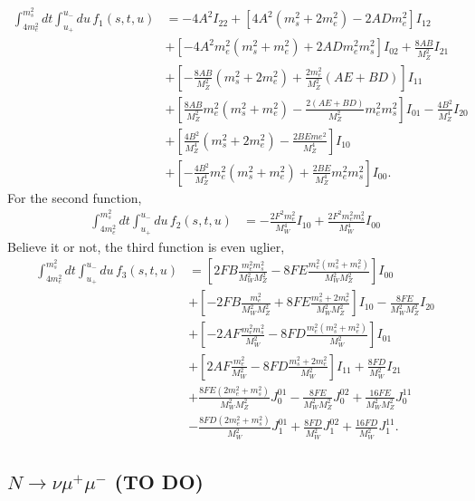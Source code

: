 \documentclass[11pt, a4paper]{article}
\begin{document}
\begin{align*}
%
\int_{4m_e^2}^{m_s^2}dt \int_{u_+}^{u_-} du\,f_1(s,t,u) &= -4A^2 I_{22} + \left[4A^2(m_s^2+2m_e^2) - 2ADm_e^2\right]I_{12}\\
%
~~~~& + \left[ -4A^2m_e^2(m_s^2+m_e^2) + 2ADm_e^2m_s^2\right]I_{02} + \frac{8AB}{M_Z^2}I_{21}\\
%
~~~~& + \left[ -\frac{8AB}{M_Z^2} (m_s^2+2m_e^2) + \frac{2m_e^2}{M_Z^2} (AE + BD) \right]I_{11} \\
%
~~~~& + \left[ \frac{8AB}{M_Z^2}m_e^2(m_s^2+m_e^2) - \frac{2(AE+BD)}{M_Z^2}m_e^2m_s^2 \right]I_{01} - \frac{4B^2}{M_Z^4}I_{20}\\
%
~~~~& + \left[ \frac{4B^2}{M_Z^4} (m_s^2+2m_e^2) - \frac{2BEme^2}{M_Z^4}\right]I_{10} \\
%
~~~~& + \left[ -\frac{4B^2}{M_Z^4}m_e^2(m_s^2+m_e^2) + \frac{2BE}{M_Z^4}m_e^2m_s^2 \right]I_{00}. 
%
\end{align*}
%
For the second function,
%
\begin{align*}
%
\int_{4m_e^2}^{m_s^2}dt \int_{u_+}^{u_-} du\,f_2(s,t,u) &= -\frac{2F^2m_e^2}{M_W^4}I_{10} + \frac{2F^2m_e^2m_s^2}{M_W^4}I_{00}
%
\end{align*}
%
Believe it or not, the third function is even uglier, 
%
\begin{align*}
%
\int_{4m_e^2}^{m_s^2}dt \int_{u_+}^{u_-} du\,f_3(s,t,u) &= \left[2FB\frac{m_e^2m_s^2}{M_W^2M_Z^2} - 8FE\frac{m_e^2(m_s^2+m_e^2)}{M_W^2M_Z^2}\right]I_{00}\\
%
~~~~&+ \left[-2FB\frac{m_e^2}{M_W^2M_Z^2} + 8FE\frac{m_s^2+2m_e^2}{M_W^2M_Z^2}\right]I_{10} - \frac{8FE}{M_W^2M_Z^2}I_{20} \\
%
~~~~& + \left[-2AF\frac{m_e^2m_s^2}{M_W^2} - 8FD\frac{m_e^2(m_s^2+m_e^2)}{M_W^2}\right]I_{01}\\
%
~~~~&+ \left[2AF\frac{m_e^2}{M_W^2} - 8FD\frac{m_s^2+2m_e^2}{M_W^2}\right]I_{11} + \frac{8FD}{M_W^2}I_{21}\\
%
~~~~& + \frac{8FE(2m_e^2+m_s^2)}{M_W^2M_Z^2}J^{01}_0 - \frac{8FE}{M_W^2M_Z^2}J^{02}_0 + \frac{16FE}{M_W^2M_Z^2}J^{11}_0 \\
%
~~~~& - \frac{8FD(2m_e^2+m_s^2)}{M_W^2}J^{01}_1 + \frac{8FD}{M_W^2}J^{02}_1 + \frac{16FD}{M_W^2}J^{11}_1. 
%
\end{align*}



\subsection{$N \to \nu \mu^+\mu^-$  (TO DO)}
\end{document}
